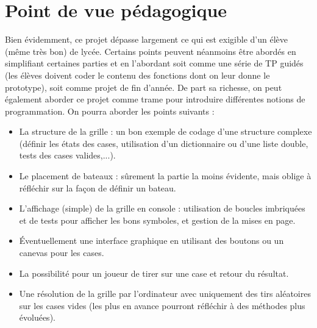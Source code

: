 \chapter{Point de vue pédagogique}

Bien évidemment, ce projet dépasse largement ce qui est exigible d'un élève (même très bon) de lycée. Certains points peuvent néanmoins être abordés en simplifiant certaines parties et en l'abordant soit comme une série de TP guidés (les élèves doivent coder le contenu des fonctions dont on leur donne le prototype), soit comme projet de fin d'année. De part sa richesse, on peut également aborder ce projet comme trame pour introduire différentes notions de programmation. On pourra aborder les points suivants :
\begin{itemize}
\item La structure de la grille : un bon exemple de codage d'une structure complexe (définir les états des cases, utilisation d'un dictionnaire ou d'une liste double, tests des cases valides,...).
\item Le placement de bateaux : sûrement la partie la moins évidente, mais oblige à réfléchir sur la façon de définir un bateau.
\item L'affichage (simple) de la grille en console : utilisation de boucles imbriquées et de tests pour afficher les bons symboles, et gestion de la mises en page.
\item Éventuellement une interface graphique en utilisant des boutons ou un canevas pour les cases.
\item La possibilité pour un joueur de tirer sur une case et retour du résultat.
\item Une résolution de la grille par l'ordinateur avec uniquement des tirs aléatoires sur les cases vides (les plus en avance pourront réfléchir à des méthodes plus évoluées).
\end{itemize}

